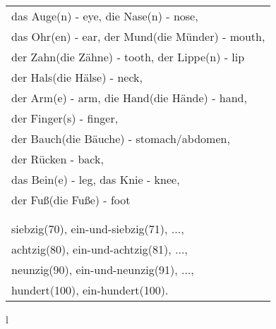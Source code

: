 \documentclass[12pt]{article}
\begin{document}
\begin{multicols}{2}
\begin{tabular}{l}
		das Auge(n) - eye, die Nase(n) - nose,                \\
		das Ohr(en) - ear, der Mund(die Münder) - mouth,      \\
		der Zahn(die Zähne) - tooth, der Lippe(n) - lip       \\
		der Hals(die Hälse) - neck,                           \\
		der Arm(e) - arm, die Hand(die Hände) - hand,         \\
		der Finger(s) - finger,                               \\
		der Bauch(die Bäuche) - stomach/abdomen,              \\
		der Rücken - back,                                    \\
		das Bein(e) - leg, das Knie - knee,                   \\
		der Fuß(die Fuße) - foot                              \\
		\\
		\hline                                                \\
		siebzig(70), ein-und-siebzig(71), ...,                \\
		achtzig(80), ein-und-achtzig(81), ...,                \\
		neunzig(90), ein-und-neunzig(91), ...,                \\
		hundert(100), ein-hundert(100).                \\
	\end{tabular}{l}
\end{multicols}
\end{document}

